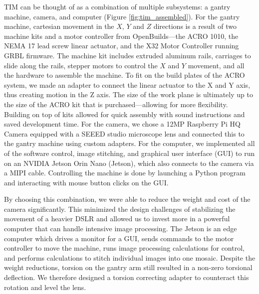 \documentclass[a4paper,12pt]{article}
\begin{document}
TIM can be thought of as a combination of multiple subsystems: a gantry machine, camera, and computer (Figure \ref{fig:tim_assembled}). 
For the gantry machine, cartesian movement in the $X$, $Y$ and $Z$ directions is a result of two machine kits and a motor controller from OpenBuilds---the ACRO 1010, the NEMA 17 lead screw linear actuator, and the X32 Motor Controller running GRBL firmware. 
The machine kit includes extruded aluminum rails, carriages to slide along the rails, stepper motors to control the $X$ and $Y$ movement, and all the hardware to assemble the machine. 
To fit on the build plates of the ACRO system, we made an adapter to connect the linear actuator to the X and Y axis, thus creating motion in the Z axis.
The size of the work plane is ultimately up to the size of the ACRO kit that is purchased---allowing for more flexibility.
Building on top of kits allowed for quick assembly with sound instructions and saved development time. 
For the camera, we chose a 12MP Raspberry Pi HQ Camera equipped with a SEEED studio microscope lens and connected this to the gantry machine using custom adapters.
For the computer, we implemented all of the software control, image stitching, and graphical user interface (GUI) to run on an NVIDIA Jetson Orin Nano (Jetson), which also connects to the camera via a MIPI cable. %
Controlling the machine is done by launching a Python program and interacting with mouse button clicks on the GUI. 

By choosing this combination, we were able to reduce the weight and cost of the camera significantly. This minimized the design challenges of stabilizing the movement of a heavier DSLR and allowed us to invest more in a powerful computer that can handle intensive image processing. 
The Jetson is an edge computer which drives a monitor for a GUI, sends commands to the motor controller to move the machine, runs image processing calculations for control, and performs calculations to stitch individual images into one mosaic. 
Despite the weight reductions, torsion on the gantry arm still resulted in a non-zero torsional deflection. We therefore designed a torsion correcting adapter to counteract this rotation and level the lens.
\end{document}
